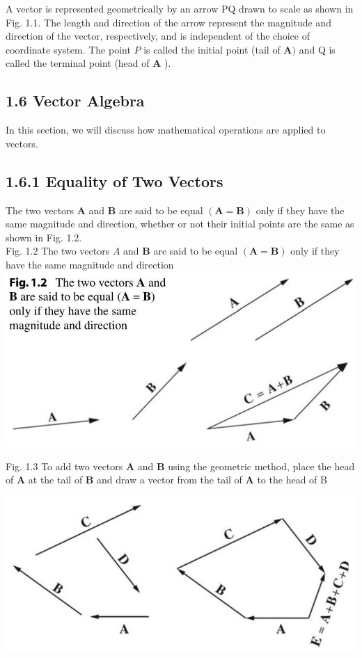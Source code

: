 \documentclass[10pt]{article}
\begin{document}
A vector is represented geometrically by an arrow PQ drawn to scale as shown in Fig. 1.1. The length and direction of the arrow represent the magnitude and direction of the vector, respectively, and is independent of the choice of coordinate system. The point $P$ is called the initial point (tail of $\mathbf{A})$ and Q is called the terminal point (head of $\mathbf{A}$ ).

\subsection*{1.6 Vector Algebra}
In this section, we will discuss how mathematical operations are applied to vectors.

\subsection*{1.6.1 Equality of Two Vectors}
The two vectors $\mathbf{A}$ and $\mathbf{B}$ are said to be equal $(\mathbf{A}=\mathbf{B})$ only if they have the same magnitude and direction, whether or not their initial points are the same as shown in Fig. 1.2.\\
Fig. 1.2 The two vectors $A$ and $\mathbf{B}$ are said to be equal $(\mathbf{A}=\mathbf{B})$ only if they have the same magnitude and direction\\
\includegraphics[max width=\textwidth, center]{2024_09_13_db1f357d2aad0a03eb2eg-014(2)}

Fig. 1.3 To add two vectors $\mathbf{A}$ and $\mathbf{B}$ using the geometric method, place the head of $\mathbf{A}$ at the tail of $\mathbf{B}$ and draw a vector from the tail of $\mathbf{A}$ to the head of B

\begin{center}
\includegraphics[max width=\textwidth]{2024_09_13_db1f357d2aad0a03eb2eg-014(1)}
\end{center}
\end{document}
